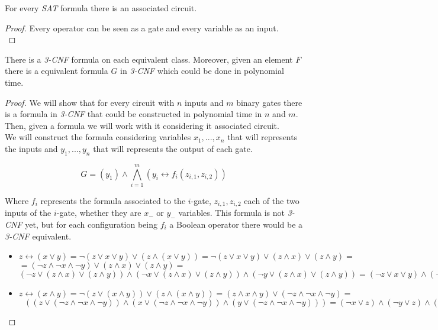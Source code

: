 	
\begin{lemma}
	For every \emph{SAT} formula there is an associated circuit.
\end{lemma}
\begin{proof}
	Every operator can be seen as a gate and every variable as an input.\\
\end{proof}
	
\begin{theorem}
  There is a \emph{3-CNF} formula on each equivalent class. Moreover, given an element $F$  there is a equivalent formula $G$  in \emph{3-CNF} which could be done in polynomial time. 
\end{theorem}

\begin{proof}
We will show that for every circuit with $n$ inputs and $m$ binary gates there is a formula in \emph{3-CNF}  that could be constructed in polynomial time in $n$ and $m$. Then, given a formula we will work with it considering it associated circuit.\\

We will construct the formula considering variables $x_1,...,x_n$ that will represents the inputs and $y_1,...,y_n$ that will represents the output of each gate. 

$$ G = (y_1) \wedge \bigwedge_{i=1}^m (y_i \leftrightarrow f_i(z_{i,1},z_{i,2}))$$

Where $f_i$ represents the formula associated to the $i$-gate, $z_{i,1},z_{i,2}$ each of the two inputs of the $i$-gate, whether they are $x_-$ or $y_-$ variables. This formula is not \emph{3-CNF} yet, but for each configuration being $f_i$ a Boolean operator there would be a \emph{3-CNF} equivalent.

\begin{itemize}
	\item $z \leftrightarrow( x \vee y )  = \neg  ( z \vee  x \vee y    ) \vee (z \wedge ( x \vee y )  ) = \neg  ( z \vee  x \vee y    ) \vee (z \wedge x)  \vee (z \wedge y ) =$\\$= ( \neg  z \wedge  \neg  x \wedge \neg   y    ) \vee (z \wedge x)  \vee (z \wedge y )  =$$
	 (\neg  z \vee (z \wedge x)  \vee (z \wedge y ))  \wedge  
	 (\neg  x \vee (z \wedge x)  \vee (z \wedge y )) \wedge
	 (\neg  y \vee (z \wedge x)  \vee (z \wedge y ))   =
	 (\neg  z \vee x  \vee y )  \wedge  
	 (\neg  x \vee z  ) \wedge
	 (\neg  y \vee z ) $   
	\item $z \leftrightarrow( x \wedge y ) = \neg ( z \vee ( x \wedge y )) \vee (z \wedge ( x \wedge y )) = (z\wedge x \wedge y ) \vee  (\neg  z\wedge \neg  x \wedge \neg  y )  =$\\$\ \ \ ((z\vee  (\neg  z\wedge \neg  x \wedge \neg  y )  ) \wedge (x \vee  (\neg  z\wedge \neg  x \wedge \neg  y )  ) \wedge (y\vee  (\neg  z\wedge \neg  x \wedge \neg  y )  ) ) = (\neg  x \vee z) \wedge (\neg  y \vee z ) \wedge (\neg  z \vee x ) \wedge (\neg  y \vee x ) \wedge(\neg  z\vee y )\wedge (\neg  x\vee y )$
	

\end{itemize}
\end{proof}
